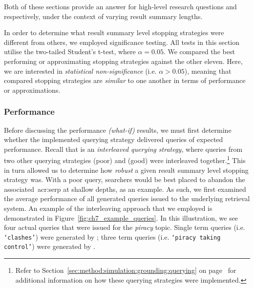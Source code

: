 Both of these sections provide an answer for high-level research questions  and  respectively, under the context of varying result summary lengths.

In order to determine what result summary level stopping strategies were different from others, we employed significance testing. All tests in this section utilise the two-tailed Student's t-test, where $\alpha=0.05$. We compared the best performing or approximating stopping strategies against the other eleven. Here, we are interested in \emph{statistical non-significance} (i.e. $\alpha > 0.05$), meaning that compared stopping strategies are \emph{similar} to one another in terms of performance or approximations.

\subsubsection{Performance}\label{sec:snippets:simulations:results:perf}
Before discussing the performance \emph{(what-if)} results, we must first determine whether the implemented querying strategy  delivered queries of expected performance. Recall that  is an \emph{interleaved querying strategy,} where queries from two other querying strategies  (poor) and  (good) were interleaved together.\footnote{Refer to Section~\ref{sec:method:simulation:grounding:querying} on page~\pageref{sec:method:simulation:grounding:querying} for additional information on how these querying strategies were implemented.} This in turn allowed us to determine how \emph{robust} a given result summary level stopping strategy was. With a poor query, searchers would be best placed to abandon the associated~\gls{acr:serp} at shallow depths, as an example. As such, we first examined the average performance of all generated queries issued to the underlying retrieval system. An example of the interleaving approach that we employed is demonstrated in Figure~\ref{fig:ch7_example_queries}. In this illustration, we see four actual queries that were issued for the \emph{piracy} topic. Single term queries (i.e. \texttt{`clashes'}) were generated by ; three term queries (i.e. \texttt{`piracy taking control'}) were generated by .

